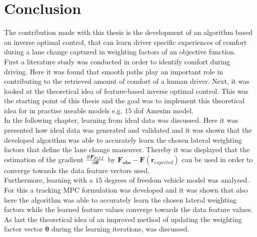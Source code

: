 \chapter{Conclusion}
\label{cha:conclusion}
The contribution made with this thesis is the development of an algorithm based on inverse optimal control, that can learn driver specific experiences of comfort during a lane change captured in weighting factors of an objective function.\\
First a literature study was conducted in order to identify comfort during driving. Here it was found that smooth paths play an important role in contributing to the retrieved amount of comfort of a human driver. Next, it was looked at the theoretical idea of feature-based inverse optimal control. This was the starting point of this thesis and the goal was to implement this theoretical idea for in practise useable models e.g. $15$ dof Amesim model.\\
In the following chapter, learning from ideal data was discussed. Here it was presented how ideal data was generated and validated and it was shown that the developed algorithm was able to accurately learn the chosen lateral weighting factors that define the lane change maneuver. Thereby it was displayed that the estimation of the gradient $\pdv{\bm{F}_{diff}}{\bm{\theta}}$ by $ \bm{F_{obs}} - \bm{F}(\bm{r}_{expected})$ can be used in order to converge towards the data feature vectors used.\\
Furthermore, learning with a $15$ degrees of freedom vehicle model was analysed. For this a tracking MPC formulation was developed and it was shown that also here 
the algorithm was able to accurately learn the chosen lateral weighting factors while the learned feature values converge towards the data feature values.\\
As last the theoretical idea of an improved method of updating the weighting factor vector $\bm{\theta}$ during the learning iterations, was discussed.\\

